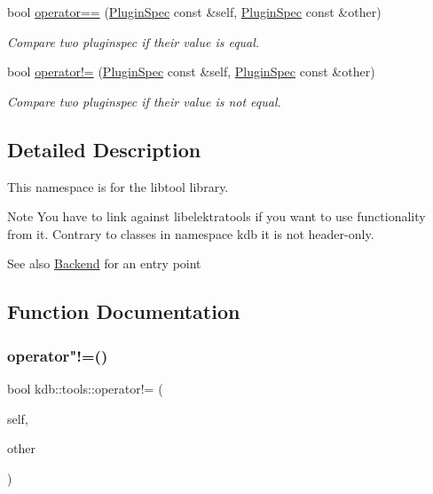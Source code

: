 \begin{DoxyCompactItemize}
bool \hyperlink{namespacekdb_1_1tools_a6f0740b75d32bfea4ef285e18b9a52f4}{operator==} (\hyperlink{classkdb_1_1tools_1_1PluginSpec}{Plugin\+Spec} const \&self, \hyperlink{classkdb_1_1tools_1_1PluginSpec}{Plugin\+Spec} const \&other)
\begin{DoxyCompactList}\small\item\em Compare two pluginspec if their value is equal. \end{DoxyCompactList}\item 
bool \hyperlink{namespacekdb_1_1tools_a3a09f4414aa2fe068879665d6285093e}{operator!=} (\hyperlink{classkdb_1_1tools_1_1PluginSpec}{Plugin\+Spec} const \&self, \hyperlink{classkdb_1_1tools_1_1PluginSpec}{Plugin\+Spec} const \&other)
\begin{DoxyCompactList}\small\item\em Compare two pluginspec if their value is not equal. \end{DoxyCompactList}\end{DoxyCompactItemize}


\subsection{Detailed Description}
This namespace is for the libtool library. 

\begin{DoxyNote}{Note}
You have to link against libelektratools if you want to use functionality from it. Contrary to classes in namespace kdb it is not header-\/only.
\end{DoxyNote}
\begin{DoxySeeAlso}{See also}
\hyperlink{classkdb_1_1tools_1_1Backend}{Backend} for an entry point 
\end{DoxySeeAlso}


\subsection{Function Documentation}
\mbox{\label{namespacekdb_1_1tools_a3a09f4414aa2fe068879665d6285093e}} 
\subsubsection{\texorpdfstring{operator"!=()}{operator!=()}}
{\footnotesize\ttfamily bool kdb\+::tools\+::operator!= (\begin{DoxyParamCaption}\item[{\hyperlink{classkdb_1_1tools_1_1PluginSpec}{Plugin\+Spec} const \&}]{self,  }\item[{\hyperlink{classkdb_1_1tools_1_1PluginSpec}{Plugin\+Spec} const \&}]{other }\end{DoxyParamCaption})}



